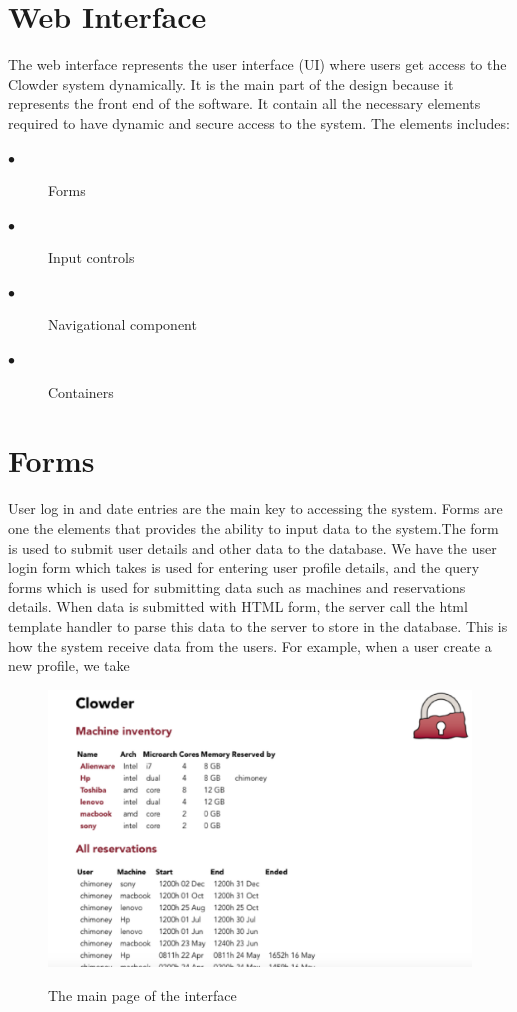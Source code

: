 \section{Web Interface}
The web interface represents the user interface (UI) where users get access to the Clowder system dynamically. It is the main part of the design because it represents the front end of the software.  It contain all the necessary elements required to have dynamic and secure access to the system. The elements includes:
\begin{description}
  \item[$\bullet$] Forms
  \item[$\bullet$] Input controls
  \item[$\bullet$] Navigational component
  \item[$\bullet$] Containers
\end{description}
\section{Forms}
User log in and date entries are the main key to accessing the system. Forms are one the elements that provides the ability to input data to the system.The form is used to submit user details and other data to the database. We have the user login form which takes is used for entering user profile details, and the query forms which is used for submitting data such as machines and reservations details. When data is submitted with HTML form, the server call the html template handler to parse this data to the server to store in the database. This is how the system receive data from the users. For example, when a user create a new profile, we take
\begin{figure}[h]
\includegraphics[width = \linewidth]{mainpage.eps}
\label{fig:Web Inteerface}
\caption{The main page of the interface}
\end{figure}

